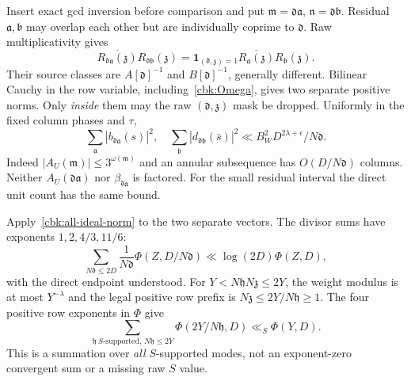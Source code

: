 Insert exact gcd inversion before comparison and put
$\mathfrak m=\mathfrak d\mathfrak a$,
$\mathfrak n=\mathfrak d\mathfrak b$.
Residual $\mathfrak a,\mathfrak b$ may overlap each other but are
individually coprime to $\mathfrak d$. Raw multiplicativity gives
\[
 \overline{R_{\mathfrak d\mathfrak a}(\mathfrak z)}
 R_{\mathfrak d\mathfrak b}(\mathfrak z)
 =\mathbf1_{(\mathfrak d,\mathfrak z)=1}
              \overline{R_{\mathfrak a}(\mathfrak z)}R_{\mathfrak b}(\mathfrak z).
\]
Their source classes are $A[\mathfrak d]^{-1}$ and
$B[\mathfrak d]^{-1}$, generally different. Bilinear Cauchy in the
row variable, including~\eqref{cbk:Omega}, gives two separate
positive norms. Only \emph{inside} them may the raw
$(\mathfrak d,\mathfrak z)$ mask be dropped. Uniformly in the
fixed column phases and $\tau$,
\begin{equation}\label{cbk:subsequence}
 \sum_{\mathfrak a}|b_{\mathfrak d\mathfrak a}(s)|^2,
 \quad\sum_{\mathfrak b}|d_{\mathfrak d\mathfrak b}(\bar s)|^2
       \ll B_W^2D^{2\lambda+\epsilon}/N\mathfrak d.
\end{equation}
Indeed $|A_U(\mathfrak m)|\le3^{\omega(\mathfrak m)}$ and an annular
subsequence has $O(D/N\mathfrak d)$ columns. Neither
$A_U(\mathfrak d\mathfrak a)$ nor $\beta_{\mathfrak d\mathfrak a}$
is factored. For the small residual interval the direct unit count
has the same bound.

Apply~\eqref{cbk:all-ideal-norm} to the two separate vectors. The
divisor sums have exponents $1,2,4/3,11/6$:
\begin{equation}\label{cbk:d-Phi}
 \sum_{N\mathfrak d\le2D}\frac1{N\mathfrak d}
                      \Phi(Z,D/N\mathfrak d)
      \ll\log(2D)\Phi(Z,D),
\end{equation}
with the direct endpoint understood. For
$Y<N\mathfrak h N\mathfrak z\le2Y$, the weight modulus is at most
$Y^{-\lambda}$ and the legal positive row prefix is
$N\mathfrak z\le2Y/N\mathfrak h\ge1$.
The four positive row exponents in $\Phi$ give
\[
 \sum_{\mathfrak h\ S\text{-supported},\,N\mathfrak h\le2Y}
                  \Phi(2Y/N\mathfrak h,D)\ll_S\Phi(Y,D).
\]
This is a summation over \emph{all} $S$-supported modes, not an
exponent-zero convergent sum or a missing raw $S$ value.

